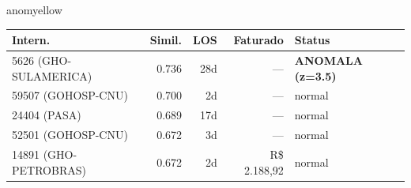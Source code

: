 \documentclass[a4paper,10pt]{article}
\begin{document}
\begin{anomalycard}[Internacao 166118 | GHO-PETROBRAS | MODERADO (z=2.34)]{anomyellow}
\begin{tabular}{l r r r l}\toprule\textbf{Intern.} & \textbf{Simil.} & \textbf{LOS} & \textbf{Faturado} & \textbf{Status} \\\midrule
5626 (GHO-SULAMERICA) & 0.736 & 28d & --- & \textcolor{anomred}{\textbf{ANOMALA (z=3.5)}} \\
59507 (GOHOSP-CNU) & 0.700 & 2d & --- & \textcolor{jcubeblue}{normal} \\
24404 (PASA) & 0.689 & 17d & --- & \textcolor{jcubeblue}{normal} \\
52501 (GOHOSP-CNU) & 0.672 & 3d & --- & \textcolor{jcubeblue}{normal} \\
14891 (GHO-PETROBRAS) & 0.672 & 2d & R\$ 2.188,92 & \textcolor{jcubeblue}{normal} \\
\bottomrule\end{tabular}


\end{anomalycard}

\newpage
\end{document}
